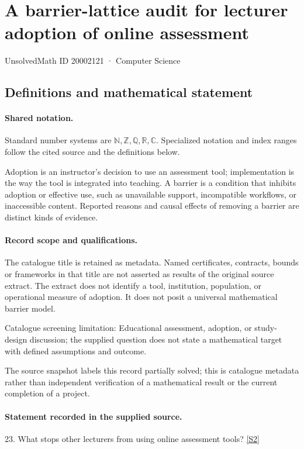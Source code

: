 \documentclass[11pt]{article}
\newcommand{\sref}[2]{\hyperlink{source:#1:#2}{[S#2]}}
\begin{document}
\setcounter{section}{20002120}
\section{A barrier-lattice audit for lecturer adoption of online assessment}\label{20002121}
{\small\sffamily UnsolvedMath ID 20002121 · Computer Science}
\subsection{Definitions and mathematical statement}

\paragraph{Shared notation.}Standard number systems are $\mathbb N,\mathbb Z,\mathbb Q,\mathbb R,\mathbb C$. Specialized notation and index ranges follow the cited source and the definitions below.


Adoption is an instructor's decision to use an assessment tool; implementation is the way the tool is integrated into teaching. A barrier is a condition that inhibits adoption or effective use, such as unavailable support, incompatible workflows, or inaccessible content. Reported reasons and causal effects of removing a barrier are distinct kinds of evidence.
\paragraph{Record scope and qualifications.}
The catalogue title is retained as metadata. Named certificates, contracts, bounds or frameworks in that title are not asserted as results of the original source extract.
The extract does not identify a tool, institution, population, or operational measure of adoption. It does not posit a universal mathematical barrier model.

Catalogue screening limitation: Educational assessment, adoption, or study-design discussion; the supplied question does not state a mathematical target with defined assumptions and outcome.

The source snapshot labels this record partially solved; this is catalogue metadata rather than independent verification of a mathematical result or the current completion of a project.
\paragraph{Statement recorded in the supplied source.}
23. What stops other lecturers from using online assessment tools? \sref{20002121}{2}
\end{document}
